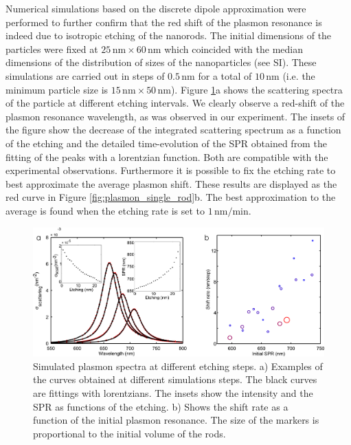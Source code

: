 \documentclass[a4paper,oneside,onecolumn]{article}
\newcommand{\nm}{\ensuremath{\,\textrm{nm}}}
\begin{document}
Numerical simulations based on the discrete dipole approximation were
performed to further confirm that the red shift of the plasmon resonance is
indeed due to isotropic etching of the nanorods. The initial dimensions of the
particles were fixed at $25\nm\times60\nm$ which coincided with the median
dimensions of the distribution of sizes of the nanoparticles (see SI). These
simulations are carried out in steps of $0.5\nm$ for a total of $10\nm$ (i.e.
the minimum particle size is $15\nm\times 50 \nm$). Figure
\ref{fig:simulations}a shows the scattering spectra of the particle at
different etching intervals. We clearly observe a red-shift of the plasmon
resonance wavelength, as was observed in our experiment. The insets of the
figure show the decrease of the integrated scattering spectrum as a function of
the etching and the detailed time-evolution of the SPR obtained from the fitting
of the peaks with a lorentzian function. Both are compatible with the
experimental observations. Furthermore it is possible to fix the etching rate to
best approximate the average plasmon shift. These results are displayed as the
red curve in Figure \ref{fig:plasmon_single_rod}b. The best approximation to
the average is found when the etching rate is set to $1\nm/\textrm{min}$. 

\begin{figure}[p]
 \centering
 \includegraphics[width=0.95\linewidth]{Figures/02_Simulations/simulations.png}
 \caption{Simulated plasmon spectra at different etching steps. a) Examples of
 the curves obtained at different simulations steps. The black curves are
 fittings with lorentzians. The insets show the intensity and the SPR as
 functions of the etching. b) Shows the shift rate as a function of the initial
 plasmon resonance. The size of the markers is proportional to the initial
 volume of the rods.}
 \label{fig:simulations}
\end{figure}
\end{document}
